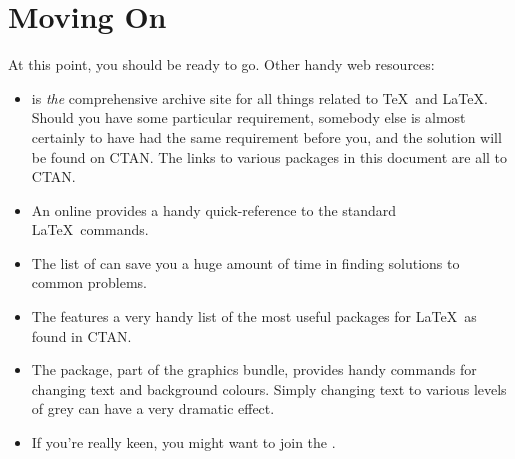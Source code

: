 \section{Moving On}
\label{sec:Conclusions}

At this point, you should be ready to go.  Other handy web resources:
\begin{itemize}
\item {} is \emph{the} comprehensive
    archive site for all things related to \TeX\ and \LaTeX. 
    Should you have some particular requirement, somebody else is
    almost certainly to have had the same requirement before you,
    and the solution will be found on \ac{CTAN}.  The links to
    various packages in this document are all to \ac{CTAN}.

\item An online
     provides a handy quick-reference
    to the standard \LaTeX\ commands.

\item The list of 
    can save you a huge amount of time in finding solutions to
    common problems.

\item The  features a very handy list of the most useful
    packages for \LaTeX\ as found in \ac{CTAN}.

\item The
    package, part of the graphics bundle, provides handy commands
    for changing text and background colours.  Simply changing
    text to various levels of grey can have a very 
    \textcolor{greytext}{dramatic effect}.


\item If you're really keen, you might want to join the
    .

\end{itemize}



